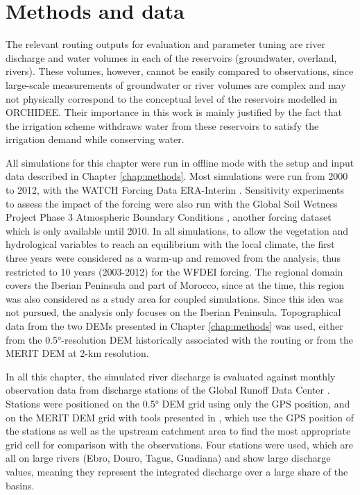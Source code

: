 \section{Methods and data}

The relevant routing outputs for evaluation and parameter tuning are river discharge and water volumes in each of the reservoirs (groundwater, overland, rivers). 
These volumes, however, cannot be easily compared to observations, since large-scale measurements of groundwater or river volumes are complex and may not physically correspond to the conceptual level of the reservoirs modelled in ORCHIDEE.
Their importance in this work is mainly justified by the fact that the irrigation scheme withdraws water from these reservoirs to satisfy the irrigation demand while conserving water.

All simulations for this chapter were run in offline mode with the setup and input data described in Chapter \ref{chap:methods}.
Most simulations were run from 2000 to 2012, with the WATCH Forcing Data ERA-Interim \citep[WFDEI, ][]{weedon_wfdei_2014}. Sensitivity experiments to assess the impact of the forcing were also run with the Global Soil Wetness Project Phase 3 Atmospheric Boundary Conditions \citep[GSWP3, ][]{kim_hyungjun_global_2017}, another forcing dataset which is only available until 2010.
In all simulations, to allow the vegetation and hydrological variables to reach an equilibrium with the local climate, the first three years were considered as a warm-up and removed from the analysis, thus restricted to 10 years (2003-2012) for the WFDEI forcing. The regional domain covers the Iberian Peninsula and part of Morocco, since at the time, this region was also considered as a study area for coupled simulations. Since this idea was not pursued, the analysis only focuses on the Iberian Peninsula.
Topographical data from the two DEMs presented in Chapter \ref{chap:methods} was used, either from the 0.5°-resolution DEM historically associated with the \std routing or from the MERIT DEM at 2-km resolution.

In all this chapter, the simulated river discharge is evaluated against monthly observation data from discharge stations of the Global Runoff Data Center \citep[GRDC, https://grdc.bafg.de,][]{fekete_global_2003}.
Stations were positioned on the 0.5° DEM grid using only the GPS position, and on the MERIT DEM grid with tools presented in \cite{polcher_hydrological_2023}, which use the GPS position of the stations as well as the upstream catchment area to find the most appropriate grid cell for comparison with the observations. 
Four stations were used, which are all on large rivers (Ebro, Douro, Tagus, Guadiana) and show large discharge values, meaning they represent the integrated discharge over a large share of the basins.

